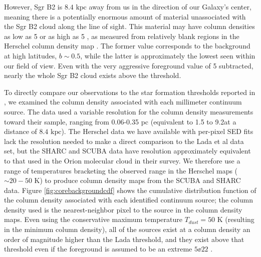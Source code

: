 \documentclass[twocolumn]{aastex61}
\newcommand{\dsgrb}{\ensuremath{8.4\textrm{~kpc}}\xspace}
\begin{document}
However, Sgr B2 is \dsgrb away from us in the direction of our Galaxy's
center, meaning there is a potentially enormous amount of material unassociated
with the Sgr B2 cloud along the line of sight.  This material may have column
densities as low as
5 \persc or as high as 5 \persc, as measured from relatively
blank regions in the Herschel column density map \citep{Battersby2011a}.  The
former value corresponds to
the background at high latitudes, $b\sim0.5$, while the latter  is
approximately the lowest seen within our field of view. 
Even with the very aggressive foreground value of 5 \persc subtracted,
nearly the whole Sgr B2 cloud exists above the \citet{Lada2010a} threshold.

To directly compare our observations to the star formation thresholds reported
in \citet{Lada2010a}, we examined the column density associated with each
millimeter continuum source.  The \citet{Lada2010a} data used a variable
resolution for the column density measurements toward their sample, ranging from
0.06-0.35 pc (equivalent to 1.5 to 9.2\arcsec at a distance of \dsgrb).  The
Herschel data we have available with per-pixel SED fits lack the resolution
needed to make a direct comparison to the Lada et al data set, but the SHARC
and SCUBA data have resolution approximately equivalent to that used in the
Orion molecular cloud in their survey.  We therefore use a range of temperatures
bracketing the observed range in the Herschel maps ($\sim20-50$ K) to produce
column density maps from the SCUBA and SHARC data.  Figure
\ref{fig:corebackgroundcdf} shows the cumulative distribution function of the
column density associated with each identified continuum source; the column
density used is the nearest-neighbor pixel to the source in the column density
maps.  Even using the conservative maximum temperature $T_{dust}=50$ K
(resulting in the minimum column density), all of the sources exist at a column
density an order of magnitude higher than the Lada threshold, and they exist
above that threshold even if the foreground is assumed to be an extreme $5\ee{22}$
\persc.
\end{document}
